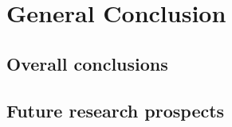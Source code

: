 \chapter{General Conclusion}

\section{Overall conclusions}

\section{Future research prospects}




